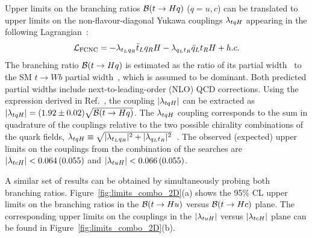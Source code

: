 Upper limits on the branching ratios $\mathcal{B}(t\to Hq)$ ($q=u,c$) can be translated to upper limits on the non-flavour-diagonal Yukawa couplings $\lambda_{tqH}$ 
appearing in the following Lagrangian~\cite{Harnik:2012pb}:
\begin{equation}
{\cal L}_\mathrm{FCNC} = -\lambda_{t_L q_R} \bar{t}_L q_R H - \lambda_{q_L t_R} \bar{q}_L t_R H  + h.c.
\end{equation}
The branching ratio $\mathcal{B}(t\to Hq)$ is estimated as the ratio of its partial width~\cite{Zhang:2013xya} to the SM $t \to Wb$ partial width~\cite{Denner:1990ns}, 
which is assumed to be dominant. Both predicted partial widths include next-to-leading-order (NLO) QCD corrections.
Using the expression derived in Ref.~\cite{Aad:2014dya}, the coupling $|\lambda_{tqH}|$ can be extracted as $| \lambda_{tqH} | = (1.92 \pm 0.02) \sqrt{\mathcal{B}(t\to Hq)}$.
The $\lambda_{tqH}$ coupling corresponds to the sum in quadrature of the couplings relative to the two possible chirality combinations of the quark fields, 
$\lambda_{tqH} \equiv \sqrt{ |\lambda_{t_Lq_R}|^2 +   |\lambda_{q_L t_R}|^2 }$~\cite{Harnik:2012pb}.
The observed (expected) upper limits on the couplings from the combination of the searches are $|\lambda_{tcH}|<0.064\,(0.055)$ and $|\lambda_{tuH}|<0.066\,(0.055)$.

A similar set of results can be obtained by  simultaneously probing both branching ratios. 
Figure~\ref{fig:limits_combo_2D}(a) shows the 95\% CL upper limits on the branching ratios in the $\mathcal{B}(t\to Hu)$ versus $\mathcal{B}(t\to Hc)$ plane. 
The corresponding upper limits on the couplings in the $|\lambda_{tuH}|$ versus $|\lambda_{tcH}|$ plane can be found in Figure~\ref{fig:limits_combo_2D}(b).

